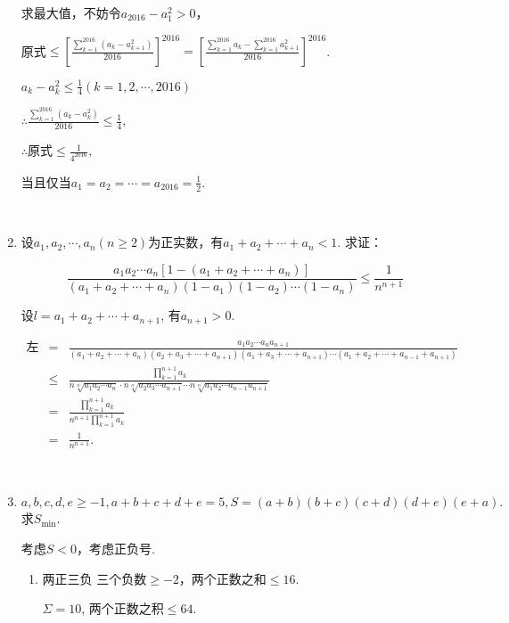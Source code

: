 \documentclass[8pt]{article}
\begin{document}
\begin{enumerate}
			求最大值，不妨令$a_{2016}-a_1^2>0，$

			原式$\displaystyle\leq\left[\frac{\sum_{k=1}^{2016}\left(a_k-a_{k+1}^2\right)}{2016}\right]^{2016}=\left[\frac{\sum_{k=1}^{2016} a_k-\sum_{k=1}^{2016} a_{k+1}^2}{2016}\right]^{2016}$.

			$a_k-a_k^2\leq\frac{1}{4} (k=1, 2, \cdots, 2016)$

			$\displaystyle \therefore \frac{\sum_{k=1}^{2016}\left(a_k-a_k^2\right)}{2016}\leq\frac{1}{4},$

			$\therefore$原式$\leq\displaystyle\frac{1}{4^{2016}},$

			当且仅当$a_1=a_2=\cdots=a_{2016}=\frac{1}{2}.$

		~\\

		\item 设$a_1, a_2, \cdots, a_n (n\geq 2)$为正实数，有$a_1+a_2+\cdots+a_n<1$. 求证：

			$$\frac{a_1a_2\cdots a_n[1-(a_1+a_2+\cdots+a_n)]}{(a_1+a_2+\cdots+a_n)(1-a_1)(1-a_2)\cdots(1-a_n)}\leq\frac{1}{n^{n+1}}$$

			设$l=a_1+a_2+\cdots+a_{n+1}$, 有$a_{n+1}>0$.

			$$
			\begin{array}{rcl}
			\text{左}&=&\displaystyle\frac{a_1 a_2 \cdots a_n a_{n+1}}{(a_1+a_2+\cdots+a_n)(a_2+a_3+\cdots+a_{n+1})(a_1+a_3+\cdots+a_{n+1})\cdots(a_1+a_2+\cdots+a_{n-1}+a_{n+1})}\\
			&\leq&\displaystyle\frac{\prod_{k=1}^{n+1}{a_k}}{n\sqrt[n]{a_1a_2\cdots a_n}\cdot n\sqrt[n]{a_2a_3\cdots a_{n+1}}\cdots n\sqrt[n]{a_1 a_2 \cdots a_{n-1} a_{n+1}}}\\
			&=&\displaystyle\frac{\prod_{k=1}^{n+1}{a_k}}{n^{n+1}\prod_{k=1}^{n+1}{a_k}}\\
			&=&\displaystyle\frac{1}{n^{n+1}}.
			\end{array}
			$$

		~\\

		\item $a, b, c, d, e\geq -1, a+b+c+d+e=5, S=(a+b)(b+c)(c+d)(d+e)(e+a).$ 求$S_{\min}$.

			考虑$S<0$，考虑正负号.

			\begin{enumerate}[label=(\arabic*)]
				\item 两正三负
					三个负数$\geq -2$，两个正数之和$\leq 16$.

					$\Sigma = 10$, 两个正数之积$\leq 64$.


\end{enumerate}
\end{enumerate}
\end{document}

